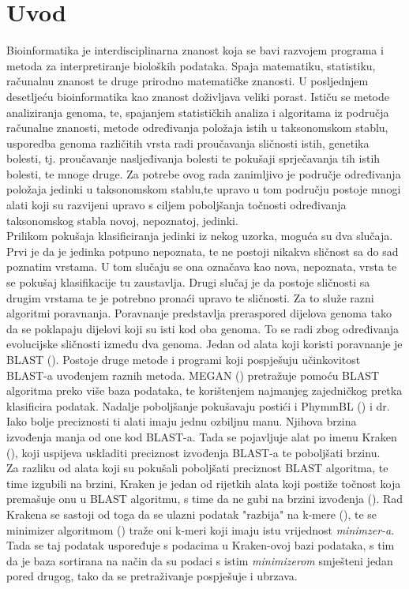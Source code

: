 \documentclass[times, utf8, zavrsni]{fer}
\begin{document}
\chapter{Uvod}
Bioinformatika je interdisciplinarna znanost koja se bavi razvojem programa i metoda za interpretiranje bioloških podataka. Spaja matematiku, statistiku, računalnu znanost te druge prirodno matematičke znanosti. U posljednjem desetljeću bioinformatika kao znanost doživljava veliki porast. Ističu se metode analiziranja genoma, te, spajanjem statističkih analiza i algoritama iz područja računalne znanosti, metode određivanja položaja istih u taksonomskom stablu, usporedba genoma različitih vrsta radi proučavanja sličnosti istih, genetika bolesti, tj. proučavanje nasljeđivanja bolesti te pokušaji sprječavanja tih istih bolesti, te mnoge druge. Za potrebe ovog rada zanimljivo je područje određivanja položaja jedinki u taksonomskom stablu,te upravo u tom području postoje mnogi alati koji su razvijeni upravo s ciljem poboljšanja točnosti određivanja taksonomskog stabla novoj, nepoznatoj, jedinki.
\\Prilikom pokušaja klasificiranja jedinki iz nekog uzorka, moguća su dva slučaja. Prvi je da je jedinka potpuno nepoznata, te ne postoji nikakva sličnost sa do sad poznatim vrstama. U tom slučaju se ona označava kao nova, nepoznata, vrsta te se pokušaj klasifikacije tu zaustavlja. Drugi slučaj je da postoje sličnosti sa drugim vrstama te je potrebno pronaći upravo te sličnosti. Za to služe razni algoritmi poravnanja. Poravnanje predstavlja preraspored dijelova genoma tako da se poklapaju dijelovi koji su isti kod oba genoma. To se radi zbog određivanja evolucijske sličnosti između dva genoma. Jedan od alata koji koristi poravnanje je BLAST (\cite{Blast}). Postoje druge metode i programi koji pospješuju učinkovitost BLAST-a uvođenjem raznih metoda. MEGAN (\cite{Megan}) pretražuje pomoću BLAST algoritma preko više baza podataka, te korištenjem najmanjeg zajedničkog pretka klasificira podatak. Nadalje poboljšanje pokušavaju postići i PhymmBL (\cite{PhymmBL}) i dr. Iako bolje preciznosti ti alati imaju jednu ozbiljnu manu. Njihova brzina izvođenja manja od one kod BLAST-a. Tada se pojavljuje alat po imenu Kraken (\cite{Kraken}), koji uspijeva uskladiti preciznost izvođenja BLAST-a te poboljšati brzinu.
\\Za razliku od alata koji su pokušali poboljšati preciznost BLAST algoritma, te time izgubili na brzini, Kraken je jedan od rijetkih alata koji postiže točnost koja premašuje onu u BLAST algoritmu, s time da ne gubi na brzini izvođenja (\cite{Kraken}). Rad Krakena se sastoji od toga da se ulazni podatak "razbija" na k-mere (\cite{jellyfish}), te se minimizer algoritmom (\cite{minim}) traže oni k-meri koji imaju istu vrijednost \textit{minimzer-a}. Tada se taj podatak uspoređuje s podacima u Kraken-ovoj bazi podataka, s tim da je baza sortirana na način da su podaci s istim \textit{minimizerom} smješteni jedan pored drugog, tako da se pretraživanje  pospješuje i ubrzava.
\end{document}

